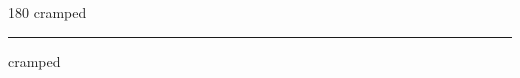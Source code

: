 
\begin{frame}
\begin{center}
\begin{turn}{180}
{\fontsize{2.5cm}{1em}\selectfont cramped}
\end{turn}
\vspace{1em}\par  
\hrule
\vspace{1em}\par  
{\fontsize{2.5cm}{1em}\selectfont cramped}
\end{center}
\end{frame}
